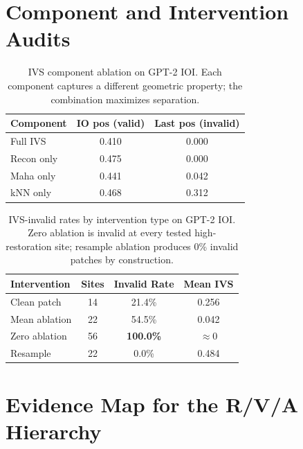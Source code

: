 \documentclass{article}
\begin{document}
\section{Component and Intervention Audits}
\label{app:component_intervention}

\begin{table}[h]
\caption{IVS component ablation on GPT-2 IOI. Each component captures a different geometric property; the combination maximizes separation.}
\label{tab:components}
\begin{center}\small
\begin{tabular}{lcc}
\toprule
\textbf{Component} & \textbf{IO pos (valid)} & \textbf{Last pos (invalid)} \\
\midrule
Full IVS & 0.410 & 0.000 \\
Recon only & 0.475 & 0.000 \\
Maha only & 0.441 & 0.042 \\
kNN only & 0.468 & 0.312 \\
\bottomrule
\end{tabular}
\end{center}
\end{table}

\begin{table}[h]
\caption{IVS-invalid rates by intervention type on GPT-2 IOI. Zero ablation is invalid at every tested high-restoration site; resample ablation produces 0\% invalid patches by construction.}
\label{tab:intervention_types}
\begin{center}\small
\begin{tabular}{lccc}
\toprule
\textbf{Intervention} & \textbf{Sites} & \textbf{Invalid Rate} & \textbf{Mean IVS} \\
\midrule
Clean patch & 14 & 21.4\% & 0.256 \\
Mean ablation & 22 & 54.5\% & 0.042 \\
Zero ablation & 56 & \textbf{100.0\%} & $\approx$0 \\
Resample & 22 & 0.0\% & 0.484 \\
\bottomrule
\end{tabular}
\end{center}
\end{table}

\section{Evidence Map for the R/V/A Hierarchy}
\label{app:evidence_map}
\end{document}
